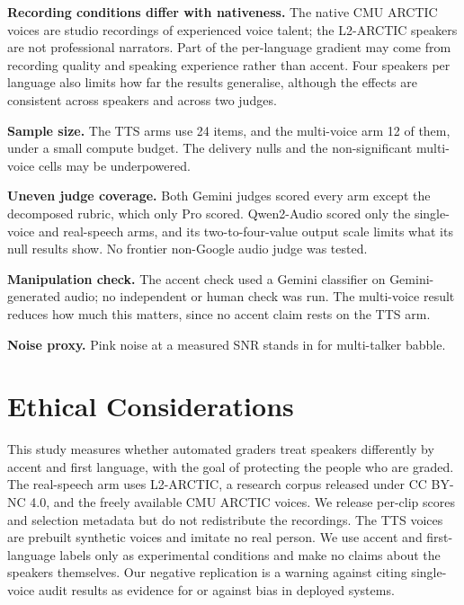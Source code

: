 \textbf{Recording conditions differ with nativeness.} The native CMU ARCTIC voices are studio recordings of experienced voice talent; the L2-ARCTIC speakers are not professional narrators. Part of the per-language gradient may come from recording quality and speaking experience rather than accent. Four speakers per language also limits how far the results generalise, although the effects are consistent across speakers and across two judges.

\textbf{Sample size.} The TTS arms use 24 items, and the multi-voice arm 12 of them, under a small compute budget. The delivery nulls and the non-significant multi-voice cells may be underpowered.

\textbf{Uneven judge coverage.} Both Gemini judges scored every arm except the decomposed rubric, which only Pro scored. Qwen2-Audio scored only the single-voice and real-speech arms, and its two-to-four-value output scale limits what its null results show. No frontier non-Google audio judge was tested.

\textbf{Manipulation check.} The accent check used a Gemini classifier on Gemini-generated audio; no independent or human check was run. The multi-voice result reduces how much this matters, since no accent claim rests on the TTS arm.

\textbf{Noise proxy.} Pink noise at a measured SNR stands in for multi-talker babble.

\section*{Ethical Considerations}
This study measures whether automated graders treat speakers differently by accent and first language, with the goal of protecting the people who are graded. The real-speech arm uses L2-ARCTIC, a research corpus released under CC BY-NC 4.0, and the freely available CMU ARCTIC voices. We release per-clip scores and selection metadata but do not redistribute the recordings. The TTS voices are prebuilt synthetic voices and imitate no real person. We use accent and first-language labels only as experimental conditions and make no claims about the speakers themselves. Our negative replication is a warning against citing single-voice audit results as evidence for or against bias in deployed systems.


